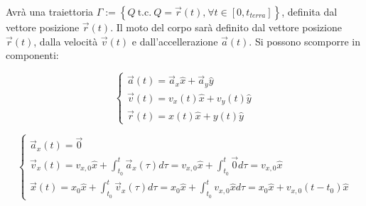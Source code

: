 \documentclass{article}
\numberwithin{equation}{subsection}
\begin{document}
\begin{center}\end{center}


Avrà una traiettoria $\Gamma := \left\{Q\:\mbox{t.c.}\:Q=\vec{r}(t)\mbox{,}\:\forall t\in \left[0, t_{terra}\right] \right\}$, 
definita dal vettore posizione $\vec{r}(t)$. Il moto del 
corpo sarà definito dal vettore posizione $\vec{r}(t)$, dalla velocità 
$\vec{v}(t)$ e dall'accellerazione $\vec{a}(t)$.
Si possono scomporre in componenti:

\begin{equation}
    \begin{cases}
        \vec{a}(t) = \vec{a}_x\hat{x} +\vec{a}_y\hat{y}\\
        \vec{v}(t) = v_x(t)\hat{x} + v_y(t)\hat{y}\\
        \vec{r}(t) = x(t)\hat{x} + y(t)\hat{y}
    \end{cases}
\end{equation}

\begin{equation}
    \begin{cases}
        \vec{a}_x(t) = \vec{0}\\
        \vec{v}_x(t) =\displaystyle v_{x,0}\hat{x}+\int_{t_0}^{t}\vec{a}_x(\tau)d\tau=v_{x,0}\hat{x}+ \int_{t_0}^{t}\vec{0}d\tau=v_{x,0}\hat{x}\\
        \vec{x}(t) = \displaystyle x_0\hat{x}+\int_{t_0}^{t}\vec{v}_x(\tau)d\tau = x_0\hat{x}+\int_{t_0}^{t}v_{x,0}\hat{x}d\tau=x_0\hat{x}+v_{x,0}(t-t_0)\hat{x}
    \end{cases}
\end{equation}
\end{document}
